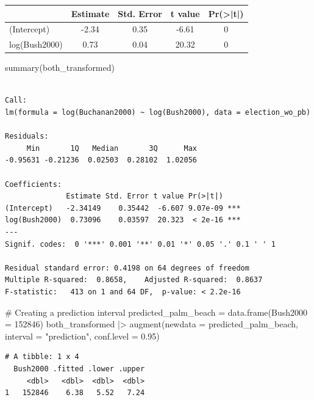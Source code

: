\documentclass[
  letterpaper,
  DIV=11,
  numbers=noendperiod]{scrartcl}
\newenvironment{Shaded}{\begin{snugshade}}{\end{snugshade}}
\newcommand{\AttributeTok}[1]{\textcolor[rgb]{0.40,0.45,0.13}{#1}}
\newcommand{\CommentTok}[1]{\textcolor[rgb]{0.37,0.37,0.37}{#1}}
\newcommand{\DecValTok}[1]{\textcolor[rgb]{0.68,0.00,0.00}{#1}}
\newcommand{\FloatTok}[1]{\textcolor[rgb]{0.68,0.00,0.00}{#1}}
\newcommand{\FunctionTok}[1]{\textcolor[rgb]{0.28,0.35,0.67}{#1}}
\newcommand{\NormalTok}[1]{\textcolor[rgb]{0.00,0.23,0.31}{#1}}
\newcommand{\OtherTok}[1]{\textcolor[rgb]{0.00,0.23,0.31}{#1}}
\newcommand{\SpecialCharTok}[1]{\textcolor[rgb]{0.37,0.37,0.37}{#1}}
\newcommand{\StringTok}[1]{\textcolor[rgb]{0.13,0.47,0.30}{#1}}
\begin{document}
\begin{table}[H]
\centering
\begin{tabular}[t]{lcccc}
\toprule
  & Estimate & Std. Error & t value & Pr(>|t|)\\
\midrule
(Intercept) & -2.34 & 0.35 & -6.61 & 0\\
log(Bush2000) & 0.73 & 0.04 & 20.32 & 0\\
\bottomrule
\end{tabular}
\end{table}

\begin{Shaded}
\begin{Highlighting}[]
\FunctionTok{summary}\NormalTok{(both\_transformed)}
\end{Highlighting}
\end{Shaded}

\begin{verbatim}

Call:
lm(formula = log(Buchanan2000) ~ log(Bush2000), data = election_wo_pb)

Residuals:
     Min       1Q   Median       3Q      Max 
-0.95631 -0.21236  0.02503  0.28102  1.02056 

Coefficients:
              Estimate Std. Error t value Pr(>|t|)    
(Intercept)   -2.34149    0.35442  -6.607 9.07e-09 ***
log(Bush2000)  0.73096    0.03597  20.323  < 2e-16 ***
---
Signif. codes:  0 '***' 0.001 '**' 0.01 '*' 0.05 '.' 0.1 ' ' 1

Residual standard error: 0.4198 on 64 degrees of freedom
Multiple R-squared:  0.8658,    Adjusted R-squared:  0.8637 
F-statistic:   413 on 1 and 64 DF,  p-value: < 2.2e-16
\end{verbatim}

\begin{Shaded}
\begin{Highlighting}[]
\CommentTok{\# Creating a prediction interval}
\NormalTok{predicted\_palm\_beach }\OtherTok{=} \FunctionTok{data.frame}\NormalTok{(}\AttributeTok{Bush2000 =} \DecValTok{152846}\NormalTok{)}
\NormalTok{both\_transformed }\SpecialCharTok{|\textgreater{}} \FunctionTok{augment}\NormalTok{(}\AttributeTok{newdata =}\NormalTok{ predicted\_palm\_beach, }\AttributeTok{interval =} \StringTok{"prediction"}\NormalTok{, }\AttributeTok{conf.level =} \FloatTok{0.95}\NormalTok{)}
\end{Highlighting}
\end{Shaded}

\begin{verbatim}
# A tibble: 1 x 4
  Bush2000 .fitted .lower .upper
     <dbl>   <dbl>  <dbl>  <dbl>
1   152846    6.38   5.52   7.24
\end{verbatim}
\end{document}
